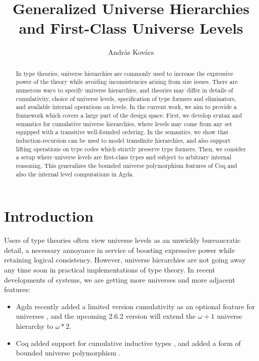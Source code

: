 \documentclass[a4paper,UKenglish,cleveref, autoref, thm-restate]{lipics-v2021}
\title{Generalized Universe Hierarchies and First-Class Universe Levels}
\author{András Kovács}{Eötvös Loránd University, Hungary}{kovacsandras@inf.elte.hu}{https://orcid.org/0000-0002-6375-9781}{}
\theoremstyle{remark}
\theoremstyle{definition}
\begin{document}
\maketitle

\begin{abstract}
In type theories, universe hierarchies are commonly used to increase the
expressive power of the theory while avoiding inconsistencies arising from size
issues. There are numerous ways to specify universe hierarchies, and theories
may differ in details of cumulativity, choice of universe levels, specification
of type formers and eliminators, and available internal operations on levels. In
the current work, we aim to provide a framework which covers a large part of the
design space. First, we develop syntax and semantics for cumulative universe
hierarchies, where levels may come from any set equipped with a transitive
well-founded ordering. In the semantics, we show that induction-recursion can be
used to model transfinite hierarchies, and also support lifting operations on
type codes which strictly preserve type formers. Then, we consider a setup where
universe levels are first-class types and subject to arbitrary internal
reasoning. This generalizes the bounded universe polymorphism features of Coq
and also the internal level computations in Agda.
\end{abstract}

\section{Introduction}
\label{sec:introduction}

Users of type theories often view universe levels as an unwieldy bureaucratic
detail, a necessary annoyance in service of boosting expressive power while
retaining logical consistency. However, universe hierarchies are not going away
any time soon in practical implementations of type theory. In recent
developments of systems, we are getting more universes and more adjacent
features:

\begin{itemize}
\item Agda recently added a limited version cumulativity as an optional feature
  for universes \cite{agdadocs}, and the upcoming 2.6.2 version will extend the $\omega+1$
  universe hierarchy to $\omega*2$.
\item Coq added support for cumulative inductive types \cite{timany18cumulative}, and added a form of
  bounded universe polymorphism \cite{ziliani15unification}.
\end{itemize}
\end{document}
